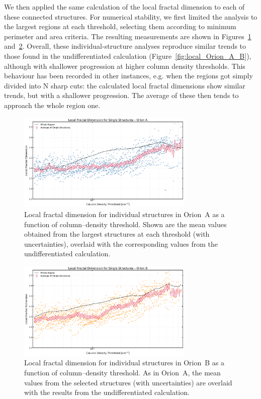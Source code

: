 We then applied the same calculation of the local fractal dimension to each of these connected structures. For numerical stability, we first limited the analysis to the largest regions at each threshold, selecting them according to minimum perimeter and area criteria. The resulting measurements are shown in Figures~\ref{fig:local_A_single_structures} and~\ref{fig:local_B_single_structures}. Overall, these individual-structure analyses reproduce similar trends to those found in the undifferentiated calculation (Figure~\ref{fig:local_Orion_A_B}), although with shallower progression at higher column density thresholds. 
This behaviour has been recorded in other instances, e.g. when the regions got simply divided into N sharp cuts: the calculated local fractal dimensions show similar trends, but with a shallower progression. The average of these then tends to approach the whole region one.   

\begin{figure}[t]
    \centering
    \includegraphics[width=0.75\textwidth]{figures/local_Orion_A_single_structures.png}
    \caption{Local fractal dimension for individual structures in Orion~A as a function of column--density threshold. 
    Shown are the mean values obtained from the largest structures at each threshold (with uncertainties), overlaid with the corresponding values from the undifferentiated calculation.}
    \label{fig:local_A_single_structures}
\end{figure}

\begin{figure}[t]
    \centering
    \includegraphics[width=0.75\textwidth]{figures/local_Orion_B_single_structures.png}
    \caption{Local fractal dimension for individual structures in Orion~B as a function of column--density threshold. 
    As in Orion~A, the mean values from the selected structures (with uncertainties) are overlaid with the results from the undifferentiated calculation.}
    \label{fig:local_B_single_structures}
\end{figure}

